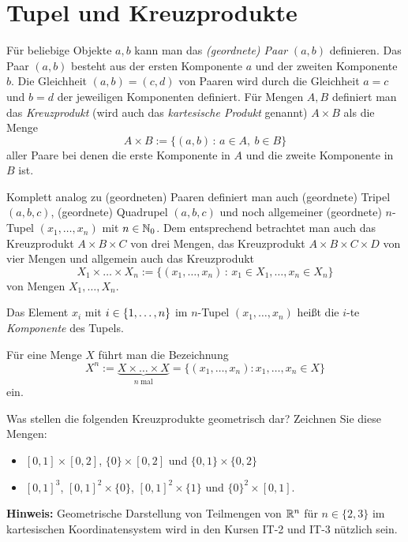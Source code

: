 \section{Tupel und Kreuzprodukte}

\begin{defn} 
Für beliebige Objekte $ a,b $ kann man das \emph{(geordnete) Paar} $ (a,b) $ definieren. Das Paar $(a,b)$ besteht aus der ersten Komponente $a$ und der zweiten Komponente $b$. 
Die Gleichheit $ (a,b) = (c,d) $ von Paaren wird durch die Gleichheit $ a=c $ und $ b=d $ der jeweiligen Komponenten definiert.  Für Mengen $ A,B $ definiert man das \emph{Kreuzprodukt} (wird auch das \emph{kartesische Produkt} genannt) $ A \times B $ als die Menge
\[
A \times B := \{ (a,b) \,:\, a \in A, \ b \in B \}
\]
aller Paare bei denen die erste Komponente in $A$ und die zweite Komponente in $B$ ist. 
\end{defn} 

\begin{defn} 
	Komplett analog zu (geordneten) Paaren definiert man auch (geordnete) Tripel $(a,b,c)$, (geordnete) Quadrupel $(a,b,c)$ und noch allgemeiner (geordnete) $n$-Tupel $(x_1,\ldots,x_n)$ mit $n \in \mathbb{N}_0$. Dem entsprechend betrachtet man auch das Kreuzprodukt $A \times B \times C$ von drei Mengen, das Kreuzprodukt $A \times B \times C \times D$ von vier Mengen und allgemein auch das Kreuzprodukt 
	\[
		X_1 \times \ldots \times X_n := \{ (x_1,\ldots,x_n) \,:\, x_1 \in X_1, \ldots , x_n \in X_n \} 
	\]
	 von Mengen $ X_1,\ldots,X_n $.
	 
	 Das Element $ x_i $ mit $ i \in \{ 1,\ldots,n \} $ im $ n $-Tupel $ (x_1,\ldots,x_n) $ heißt die $ i $-te \emph{Komponente} des Tupels.
	 
Für eine Menge $ X $ führt man die Bezeichnung
\begin{equation*}
	X^n := \underbrace{X \times \ldots \times X}_{n \:\text{mal}} = \{ (x_1,\ldots,x_n) : x_1,\ldots,x_n \in X \}
\end{equation*}
ein. 
\end{defn} 


\begin{aufg} Was stellen die folgenden Kreuzprodukte geometrisch dar? Zeichnen Sie diese Mengen:
	\begin{itemize}
		\item $ [0,1] \times [0,2] $, $ \{ 0 \} \times [0,2] $  und $ \{ 0,1 \} \times \{ 0,2 \} $ 
		\item $ [0,1]^3 $, $ [0,1]^2 \times \{ 0 \} $, $ [0,1]^2 \times \{ 1 \} $  und $ \{ 0 \}^2 \times [0,1] $. 
	\end{itemize}
	\textbf{Hinweis:} Geometrische Darstellung von Teilmengen von $\mathbb{R}^n$ für $n \in \{2,3\}$ im kartesischen Koordinatensystem wird in den Kursen IT-2 und IT-3 nützlich sein. 
\end{aufg}


